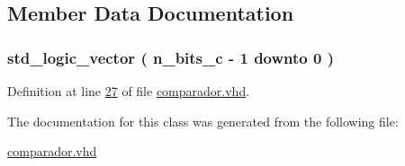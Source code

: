 \subsection{Member Data Documentation}
\hypertarget{classcomparador_1_1comparador_abf7d8be25624dd08fcc1517c8e39cb23}{}
\subsubsection[{comp\+\_\+int}]{ {\bfseries \textcolor{comment}{std\+\_\+logic\+\_\+vector}\textcolor{vhdlchar}{ }\textcolor{vhdlchar}{(}\textcolor{vhdlchar}{ }\textcolor{vhdlchar}{ }\textcolor{vhdlchar}{ }\textcolor{vhdlchar}{ }{\bfseries {\bf n\+\_\+bits\+\_\+c}} \textcolor{vhdlchar}{-\/}\textcolor{vhdlchar}{ } \textcolor{vhdldigit}{1} \textcolor{vhdlchar}{ }\textcolor{keywordflow}{downto}\textcolor{vhdlchar}{ }\textcolor{vhdlchar}{ } \textcolor{vhdldigit}{0} \textcolor{vhdlchar}{ }\textcolor{vhdlchar}{)}\textcolor{vhdlchar}{ }} \hspace{0.3cm}{\ttfamily [Signal]}}\label{classcomparador_1_1comparador_abf7d8be25624dd08fcc1517c8e39cb23}


Definition at line \hyperlink{comparador_8vhd_source_l00027}{27} of file \hyperlink{comparador_8vhd_source}{comparador.\+vhd}.



The documentation for this class was generated from the following file\+:\begin{DoxyCompactItemize}
\item 
\hyperlink{comparador_8vhd}{comparador.\+vhd}\end{DoxyCompactItemize}
